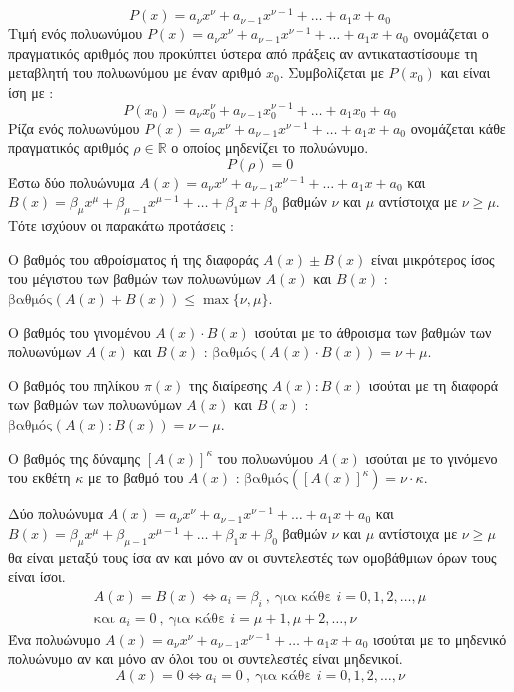 \documentclass[twoside,nofonts,internet,shmeiwseis]{thewria}
\begin{document}
\[ P(x)=a_\nu x^\nu+a_{\nu-1}x^{\nu-1}+\ldots+a_1x+a_0 \]
Τιμή ενός πολυωνύμου $ P(x)=a_\nu x^\nu+a_{\nu-1}x^{\nu-1}+\ldots+a_1x+a_0 $ ονομάζεται ο πραγματικός αριθμός που προκύπτει ύστερα από πράξεις αν αντικαταστίσουμε τη μεταβλητή του πολυωνύμου με έναν αριθμό $ x_0 $. Συμβολίζεται με $ P(x_0) $ και είναι ίση με :
\[ P(x_0)=a_\nu x_0^\nu+a_{\nu-1}x_0^{\nu-1}+\ldots+a_1x_0+a_0 \]
Ρίζα ενός πολυωνύμου $ P(x)=a_\nu x^\nu+a_{\nu-1}x^{\nu-1}+\ldots+a_1x+a_0 $ ονομάζεται κάθε πραγματικός αριθμός $ \rho\in\mathbb{R} $ ο οποίος μηδενίζει το πολυώνυμο.
\[ P(\rho)=0 \]
\thewrhmata
{}
Έστω δύο πολυώνυμα $ A(x)=a_\nu x^\nu+a_{\nu-1}x^{\nu-1}+\ldots+a_1x+a_0 $ και $ B(x)=\beta_\mu x^\mu+\beta_{\mu-1}x^{\mu-1}+\ldots+\beta_1x+\beta_0 $ βαθμών $ \nu $ και $ \mu $ αντίστοιχα με $ \nu\geq\mu $. Τότε ισχύουν οι παρακάτω προτάσεις :
\begin{rlist}
\item Ο βαθμός του αθροίσματος ή της διαφοράς $ A(x)\pm B(x) $ είναι μικρότερος ίσος του μέγιστου των βαθμών των πολυωνύμων $ A(x) $ και $ B(x) $ : $ \textrm{βαθμός}(A(x)+B(x))\leq\max\{\nu,\mu\} $.
\item Ο βαθμός του γινομένου $ A(x)\cdot B(x) $ ισούται με το άθροισμα των βαθμών των πολυωνύμων $ A(x) $ και $ B(x) $ : $ \textrm{βαθμός}(A(x)\cdot B(x))=\nu+\mu $.
\item Ο βαθμός του πηλίκου $ \pi(x) $ της διαίρεσης $ A(x):B(x) $ ισούται με τη διαφορά των βαθμών των πολυωνύμων $ A(x) $ και $ B(x) $ : $ \textrm{βαθμός}(A(x): B(x))=\nu-\mu $.
\item Ο βαθμός της δύναμης $ [A(x)]^\kappa $ του πολυωνύμου $ A(x) $ ισούται με το γινόμενο του εκθέτη $ \kappa $ με το βαθμό του $ A(x) $ : $ \textrm{βαθμός}([A(x)]^\kappa)=\nu\cdot\kappa $.
\end{rlist}
Δύο πολυώνυμα $ A(x)=a_\nu x^\nu+a_{\nu-1}x^{\nu-1}+\ldots+a_1x+a_0 $ και $ B(x)=\beta_\mu x^\mu+\beta_{\mu-1}x^{\mu-1}+\ldots+\beta_1x+\beta_0 $ βαθμών $ \nu $ και $ \mu $ αντίστοιχα με $ \nu\geq\mu $ θα είναι μεταξύ τους ίσα αν και μόνο αν οι συντελεστές των ομοβάθμιων όρων τους είναι ίσοι.
\begin{gather*}
A(x)=B(x)\Leftrightarrow a_i=\beta_i\ ,\ \textrm{για κάθε }i=0,1,2,\ldots,\mu\\
\textrm{και }a_i=0\ ,\ \textrm{για κάθε }i=\mu+1,\mu+2,\ldots,\nu
\end{gather*}
Ένα πολυώνυμο $ A(x)=a_\nu x^\nu+a_{\nu-1}x^{\nu-1}+\ldots+a_1x+a_0 $ ισούται με το μηδενικό πολυώνυμο αν και μόνο αν όλοι του οι συντελεστές είναι μηδενικοί.
\[ A(x)=0\Leftrightarrow a_i=0 \ ,\ \textrm{για κάθε }i=0,1,2,\ldots,\nu\]
\end{document}
